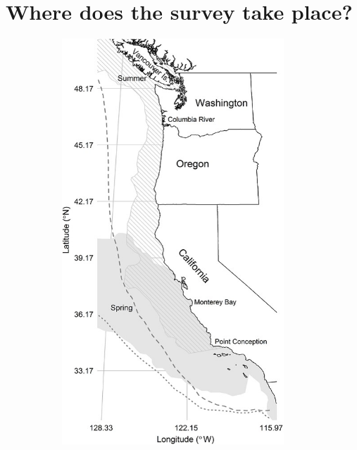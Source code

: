 \documentclass[
  letterpaper,
  oneside,
  open=any]{scrbook}
\begin{document}
\section{Where does the survey take
place?}\label{where-does-the-survey-take-place}

\begin{figure}

\begin{minipage}{0.50\linewidth}

\begin{figure}[H]

{\centering \includegraphics[width=\textwidth,height=6in]{content/images/clipboard-1472872065.png}

}


\end{figure}%

\end{minipage}%
%
\begin{minipage}{0.50\linewidth}

\begin{figure}[H]


\end{figure}
\end{minipage}
\end{figure}
\end{document}
